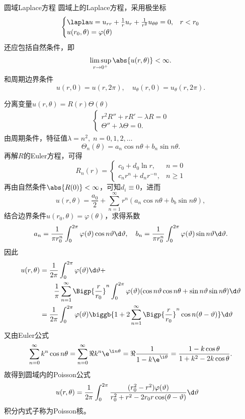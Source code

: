 \begin{example}{圆域Laplace方程}{}
	圆域上的Laplace方程，采用极坐标
	\begin{align*}
		\begin{cases}
			\lapla u=u_{rr}+\frac1ru_r+\frac1{r^2}u_{\theta\theta}=0,&r<r_0\\
			u(r_0,\theta)=\varphi(\theta)
		\end{cases}
	\end{align*}
	还应包括自然条件，即
	\[
		\limsup_{r\to0^+}\abs{u(r,\theta)}<\infty.
	\]
	和周期边界条件
	\[
		u(r,0)=u(r,2\pi),\quad u_\theta(r,0)=u_\theta(r,2\pi).
	\]
	
	分离变量$u(r,\theta)=R(r)\varTheta(\theta)$
	\begin{align*}
		\begin{cases}
			r^2R''+rR'-\lambda R=0\\
			\varTheta''+\lambda\varTheta=0.
		\end{cases}
	\end{align*}
	由周期条件，特征值$\lambda=n^2,\;n=0,1,2,\ldots$
	\[
		\varTheta_n(\theta)=a_n\cos n\theta+b_n\sin n\theta.
	\]
	再解$R$的Euler方程，可得
	\[
		R_n(r)=
		\begin{cases}
			c_0+d_0\ln r,&n=0\\
			c_nr^n+d_nr^{-n},&n\geqslant 1
		\end{cases}
	\]
	再由自然条件$\abs{R(0)}<\infty$，可知$d_i\equiv 0$，进而
	\[
		u(r,\theta)=\frac{a_0}2+\sum_{n=1}^\infty r^n(a_n\cos n\theta+b_b\sin n\theta),
	\]
	结合边界条件$u(r_0,\theta)=\varphi(\theta)$，求得系数
	\[
		a_n=\frac1{\pi r_0^n}\int_0^{2\pi}\varphi(\vartheta)\cos n\vartheta\d\vartheta,\quad b_n=\frac1{\pi r_0^n}\int_0^{2\pi}\varphi(\vartheta)\sin n\vartheta\d\vartheta.
	\]
	因此
	\begin{align*}
		u(r,\theta)&=\frac1{2\pi}\int_0^{2\pi}\varphi(\vartheta)\d\vartheta+\\
		&\qquad\frac1\pi\sum_{n=1}^\infty\Bigp{\frac r{r_0}}^n\int_0^{2\pi}\varphi(\vartheta)(\cos n\vartheta\cos n\theta+\sin n\vartheta\sin n\theta)\d\vartheta\\
		&=\frac1{2\pi}\int_0^{2\pi}\varphi(\vartheta)\biggb{1+2\sum_{n=1}^\infty\Bigp{\frac r{r_0}}^n\cos n(\theta-\vartheta)}\d\vartheta
	\end{align*}
	又由Euler公式
	\begin{align*}
	\sum_{n=0}^\infty k^n\cos n\theta=\sum_{n=0}^\infty\Re k^n\e^{\i n\theta}=\Re\frac1{1-k\e^{\i\theta}}=\frac{1-k\cos\theta}{1+k^2-2k\cos\theta}.
	\end{align*}
	故得到圆域内的Poisson公式
	\begin{align}
		u(r,\theta)&=\frac1{2\pi}\int_0^{2\pi}\frac{(r_0^2-r^2)\varphi(\vartheta)}{r_0^2+r^2-2r_0r\cos(\theta-\vartheta)}\d\vartheta
	\end{align}
	积分内式子称为Poisson核。
\end{example}
